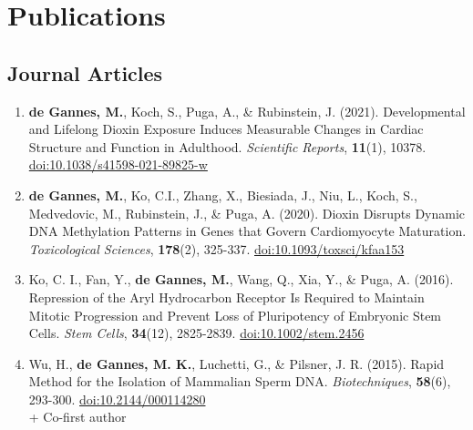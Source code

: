 \documentclass[10pt,a4paper,]{article}
\providecommand{\tightlist}{%
  \setlength{\itemsep}{0pt}\setlength{\parskip}{0pt}}
\begin{document}
\section{Publications}\label{publications}

\subsection{Journal Articles}\label{journal-articles}

\begin{enumerate}
\def\labelenumi{\arabic{enumi}.}
\tightlist
\item
  \textbf{de Gannes, M.}, Koch, S., Puga, A., \& Rubinstein, J. (2021).
  Developmental and Lifelong Dioxin Exposure Induces Measurable Changes
  in Cardiac Structure and Function in Adulthood. \emph{Scientific
  Reports}, \textbf{11}(1), 10378.
  \url{doi:10.1038/s41598-021-89825-w}\\
\item
  \textbf{de Gannes, M.}, Ko, C.I., Zhang, X., Biesiada, J., Niu, L.,
  Koch, S., Medvedovic, M., Rubinstein, J., \& Puga, A. (2020). Dioxin
  Disrupts Dynamic DNA Methylation Patterns in Genes that Govern
  Cardiomyocyte Maturation. \emph{Toxicological Sciences},
  \textbf{178}(2), 325-337. \url{doi:10.1093/toxsci/kfaa153}
\item
  Ko, C. I., Fan, Y., \textbf{de Gannes, M.}, Wang, Q., Xia, Y., \&
  Puga, A. (2016). Repression of the Aryl Hydrocarbon Receptor Is
  Required to Maintain Mitotic Progression and Prevent Loss of
  Pluripotency of Embryonic Stem Cells. \emph{Stem Cells},
  \textbf{34}(12), 2825-2839. \url{doi:10.1002/stem.2456}
\item
  Wu, H., \textbf{de Gannes, M. K.}, Luchetti, G., \& Pilsner, J. R.
  (2015). Rapid Method for the Isolation of Mammalian Sperm DNA.
  \emph{Biotechniques}, \textbf{58}(6), 293-300.
  \url{doi:10.2144/000114280}\\
  + Co-first author
\end{enumerate}
\end{document}
